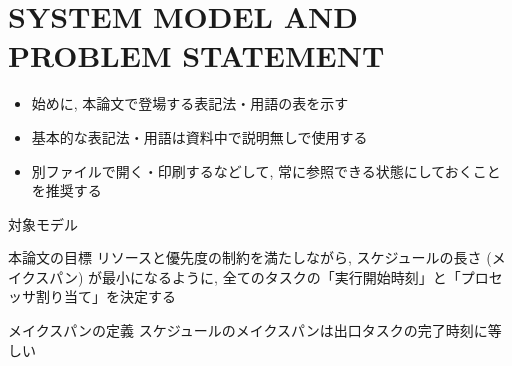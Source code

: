 
\section{SYSTEM MODEL AND PROBLEM STATEMENT}
\label{sec: system model and problem statement}

\begin{frame}{}
    \begin{itemize}
        \item 始めに, 本論文で登場する表記法・用語の表を示す
        \item 基本的な表記法・用語は資料中で説明無しで使用する
        \item 別ファイルで開く・印刷するなどして, 常に参照できる状態にしておくことを推奨する
    \end{itemize}
\end{frame}



\begin{frame}{対象モデル}
\end{frame}

\begin{frame}{本論文の目標}
    リソースと優先度の制約を満たしながら, スケジュールの長さ (メイクスパン) が最小になるように, 全てのタスクの「実行開始時刻」と「プロセッサ割り当て」を決定する
\end{frame}

\begin{frame}{メイクスパンの定義}
    スケジュールのメイクスパンは出口タスクの完了時刻に等しい
\end{frame}
